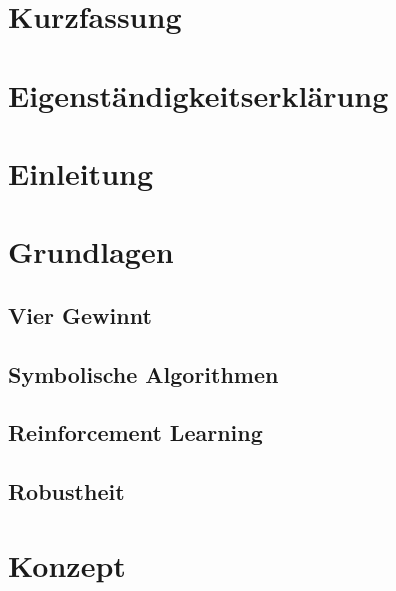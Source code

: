 \documentclass[a4paper, 12pt]{scrartcl}
\begin{document}
    \renewcommand{\figurename}{Abb.}
	\fancyhf{}
	
	\newpage
	
	\section{Kurzfassung}
	
	
	\tableofcontents
	\newpage

    \listoffigures
    \newpage

    \section*{Eigenständigkeitserklärung}
	
	\newpage
 
	\setcounter{page}{1}
	\fancyfoot[C]{\thepage}
	
	\section{Einleitung}
	
	
	\section{Grundlagen}
    
    
    \subsection{Vier Gewinnt}
    
    
	\subsection{Symbolische Algorithmen}
	

	\subsection{Reinforcement Learning}
	

	\subsection{Robustheit}\label{sec:robustheit}
	
	
    \section{Konzept}
    
    
\end{document}
